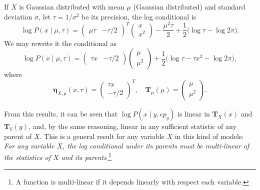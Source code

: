 \begin{exampleth}
    If \( X \) is Gaussian distributed with mean \( \mu \) (Gaussian distributed) and standard deviation \( \sigma \), let \(\tau = 1/\sigma^{2}\) be its precision,  the log conditional is
    \[
         \log P(x \mid \mu, \tau) =
         \begin{pmatrix}
             \mu \tau & -\tau/2
         \end{pmatrix}^T
         \begin{pmatrix}
             x\\
             x^2
         \end{pmatrix}
         - \frac{\mu^{2}\tau}{2} + \frac{1}{2}\big( \log \tau - \log 2\pi \big).
    \] 
    We may rewrite it the conditional as
    \[
         \log  P(x \mid \mu, \tau) =
         \begin{pmatrix}
             \tau x & -\tau/2
         \end{pmatrix}
         \begin{pmatrix}
             \mu\\
             \mu^2
         \end{pmatrix}
         + \frac{1}{2}\big( \log \tau - \tau x^2 - \log 2\pi \big),
    \]
    where
    \[
         \bm{\eta}_{X,\mu}(x,\tau) =  \begin{pmatrix}
            \tau x\\
            -\tau/2
        \end{pmatrix}^T,\quad \bm{T}_\mu(\mu)=  \begin{pmatrix}
            \mu\\
            \mu^2
        \end{pmatrix}.
    \]
\end{exampleth}

From this results, it can be seen that \( \log P(x \mid y , cp_y) \) is linear in \( \bm{T}_X(x) \) and \( \bm{T}_Y(y) \), and, by the same reasoning, linear in any sufficient statistic of any parent of \( X \). This is a general result for any variable \( X \) in this kind of models: \emph{For any variable \( X \), the log conditional under its parents must be multi-linear of the statistics of \( X \) and its parents}.\footnote{A function is multi-linear if it depends linearly with respect each variable.}

